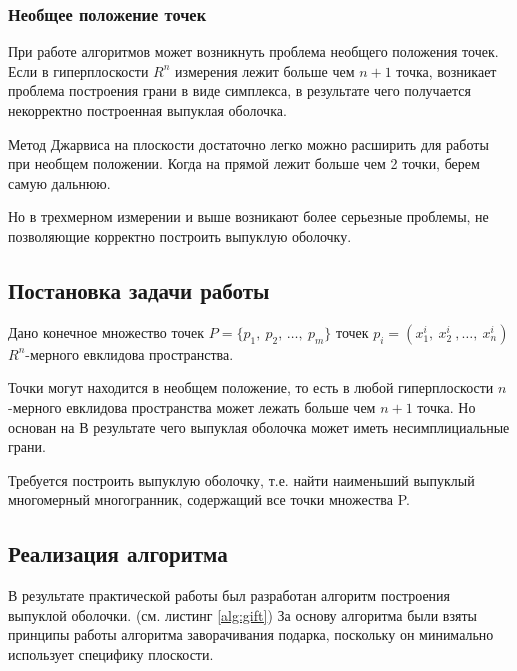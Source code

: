 \documentclass[a4paper,14pt]{extarticle}  %
\begin{document}
\subsubsection{Необщее положение точек}
При работе алгоритмов может возникнуть проблема необщего положения точек.
Если в гиперплоскости $R^n$ измерения лежит больше чем $n+1$ точка, возникает проблема построения грани в виде симплекса, в результате чего получается некорректно построенная выпуклая оболочка.

Метод Джарвиса на плоскости достаточно легко можно расширить для работы при необщем положении. Когда на прямой лежит больше чем 2 точки, берем самую дальнюю.

Но в трехмерном измерении и выше возникают более серьезные проблемы, не позволяющие корректно построить выпуклую оболочку.




\subsection{Постановка задачи работы}
Дано конечное множество точек $P=\{p_1,\ p_2,\,\ldots,\ p_m\}$ точек $p_i=(x_{1}^{i},\ x_{2}^{i}\ ,\ldots,\ x_{n}^{i})$ $R^n$-мерного евклидова пространства.

Точки могут находится в необщем положение, то есть в любой гиперплоскости $n$-мерного евклидова пространства может лежать больше чем $n+1$ точка.
Но основан на
В результате чего выпуклая оболочка может иметь несимплициальные грани.

Требуется построить выпуклую оболочку, т.е. найти наименьший выпуклый многомерный многогранник, содержащий все точки множества P.

\subsection{Реализация алгоритма}
В результате практической работы был разработан алгоритм построения выпуклой оболочки. (см. листинг \ref{alg:gift})
За основу алгоритма были взяты принципы работы алгоритма заворачивания подарка, поскольку он минимально использует специфику плоскости.
\end{document}
